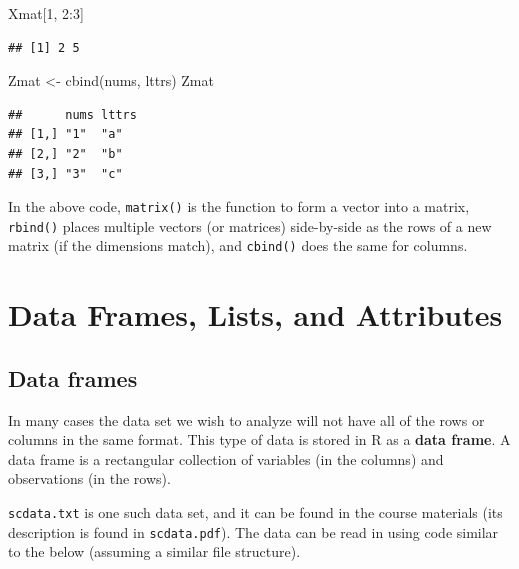 \documentclass[
]{book}
\newenvironment{Shaded}{\begin{snugshade}}{\end{snugshade}}
\newcommand{\DecValTok}[1]{\textcolor[rgb]{0.00,0.00,0.81}{#1}}
\newcommand{\FunctionTok}[1]{\textcolor[rgb]{0.00,0.00,0.00}{#1}}
\newcommand{\NormalTok}[1]{#1}
\newcommand{\OtherTok}[1]{\textcolor[rgb]{0.56,0.35,0.01}{#1}}
\newcommand{\SpecialCharTok}[1]{\textcolor[rgb]{0.00,0.00,0.00}{#1}}
\begin{document}
\begin{Shaded}
\begin{Highlighting}[]
\NormalTok{Xmat[}\DecValTok{1}\NormalTok{, }\DecValTok{2}\SpecialCharTok{:}\DecValTok{3}\NormalTok{]}
\end{Highlighting}
\end{Shaded}

\begin{verbatim}
## [1] 2 5
\end{verbatim}

\begin{Shaded}
\begin{Highlighting}[]
\NormalTok{Zmat }\OtherTok{\textless{}{-}} \FunctionTok{cbind}\NormalTok{(nums, lttrs)}
\NormalTok{Zmat}
\end{Highlighting}
\end{Shaded}

\begin{verbatim}
##      nums lttrs
## [1,] "1"  "a"  
## [2,] "2"  "b"  
## [3,] "3"  "c"
\end{verbatim}

In the above code, \texttt{matrix()} is the function to form a vector into a matrix, \texttt{rbind()} places multiple vectors (or matrices) side-by-side as the rows of a new matrix (if the dimensions match), and \texttt{cbind()} does the same for columns.

\hypertarget{data-frames-lists-and-attributes}{%
\section{Data Frames, Lists, and Attributes}\label{data-frames-lists-and-attributes}}

\hypertarget{data-frames}{%
\subsection*{Data frames}\label{data-frames}}

In many cases the data set we wish to analyze will not have all of the rows or columns in the same format. This type of data is stored in R as a \textbf{data frame}. A data frame is a rectangular collection of variables (in the columns) and observations (in the rows).

\texttt{scdata.txt} is one such data set, and it can be found in the course materials (its description is found in \texttt{scdata.pdf}). The data can be read in using code similar to the below (assuming a similar file structure).
\end{document}
